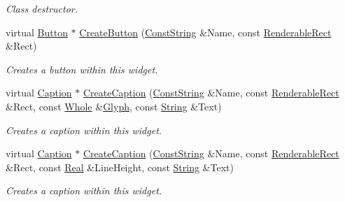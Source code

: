 \begin{DoxyCompactItemize}
\begin{DoxyCompactList}\small\item\em Class destructor. \item\end{DoxyCompactList}\item 
virtual \hyperlink{classMezzanine_1_1UI_1_1Button}{Button} $\ast$ \hyperlink{classMezzanine_1_1UI_1_1RenderableContainerWidget_ab4923b194c5eedf4fe24861cc19ee641}{CreateButton} (\hyperlink{namespaceMezzanine_a63cd699ac54b73953f35ec9cfc05e506}{ConstString} \&Name, const \hyperlink{structMezzanine_1_1UI_1_1RenderableRect}{RenderableRect} \&Rect)
\begin{DoxyCompactList}\small\item\em Creates a button within this widget. \item\end{DoxyCompactList}\item 
virtual \hyperlink{classMezzanine_1_1UI_1_1Caption}{Caption} $\ast$ \hyperlink{classMezzanine_1_1UI_1_1RenderableContainerWidget_a091ce1b3a1b9596c038bad6ce1cf0a91}{CreateCaption} (\hyperlink{namespaceMezzanine_a63cd699ac54b73953f35ec9cfc05e506}{ConstString} \&Name, const \hyperlink{structMezzanine_1_1UI_1_1RenderableRect}{RenderableRect} \&Rect, const \hyperlink{namespaceMezzanine_adcbb6ce6d1eb4379d109e51171e2e493}{Whole} \&\hyperlink{classMezzanine_1_1UI_1_1Glyph}{Glyph}, const \hyperlink{namespaceMezzanine_acf9fcc130e6ebf08e3d8491aebcf1c86}{String} \&Text)
\begin{DoxyCompactList}\small\item\em Creates a caption within this widget. \item\end{DoxyCompactList}\item 
virtual \hyperlink{classMezzanine_1_1UI_1_1Caption}{Caption} $\ast$ \hyperlink{classMezzanine_1_1UI_1_1RenderableContainerWidget_a073a30682c074b96d12975bc1fd9d1ea}{CreateCaption} (\hyperlink{namespaceMezzanine_a63cd699ac54b73953f35ec9cfc05e506}{ConstString} \&Name, const \hyperlink{structMezzanine_1_1UI_1_1RenderableRect}{RenderableRect} \&Rect, const \hyperlink{namespaceMezzanine_a726731b1a7df72bf3583e4a97282c6f6}{Real} \&LineHeight, const \hyperlink{namespaceMezzanine_acf9fcc130e6ebf08e3d8491aebcf1c86}{String} \&Text)
\begin{DoxyCompactList}\small\item\em Creates a caption within this widget. \item\end{DoxyCompactList}\item 

\end{DoxyCompactItemize}
